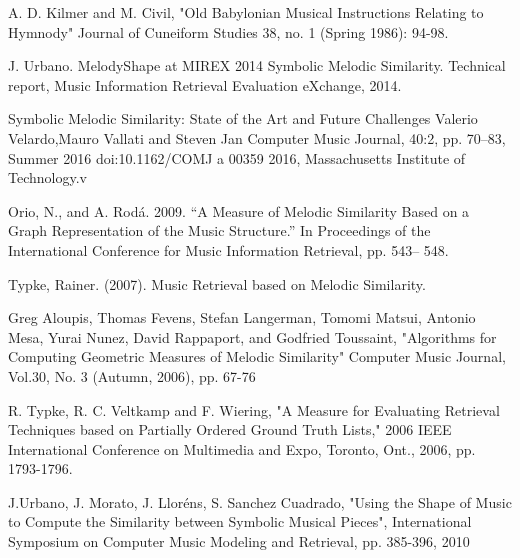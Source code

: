 \documentclass{llncs}
\begin{document}
\begin{itemize}

	\begin{thebibliography}{7}
	
	A. D. Kilmer and M. Civil, 
	"Old Babylonian Musical Instructions Relating to Hymnody" 
	Journal of Cuneiform Studies 38, 
	no. 1 (Spring 1986): 94-98.

	J. Urbano. MelodyShape at 
	MIREX 2014 Symbolic Melodic Similarity. 
	Technical report, Music Information Retrieval Evaluation eXchange, 2014.

	Symbolic Melodic Similarity: State of the Art and Future Challenges
	Valerio Velardo,Mauro Vallati and Steven Jan
	Computer Music Journal, 40:2, pp. 70–83, Summer 2016 doi:10.1162/COMJ a 00359
	2016, Massachusetts Institute of Technology.v

	 Orio, N., and A. Rodá. 2009. “A Measure of Melodic Similarity Based on a Graph Representation of the Music Structure.” In Proceedings of the International Conference for Music Information Retrieval, pp. 543– 548.

	 Typke, Rainer. (2007). Music Retrieval based on Melodic Similarity.

	 Greg Aloupis, Thomas Fevens, Stefan Langerman, Tomomi Matsui, Antonio Mesa, Yurai Nunez, David Rappaport, and Godfried Toussaint, "Algorithms for Computing Geometric Measures of Melodic Similarity" Computer Music Journal, Vol.30, No. 3 (Autumn, 2006), pp. 67-76

	 R. Typke, R. C. Veltkamp and F. Wiering, "A Measure for Evaluating Retrieval Techniques based on Partially Ordered Ground Truth Lists," 2006 IEEE International Conference on Multimedia and Expo, Toronto, Ont., 2006, pp. 1793-1796.
	
	 J.Urbano, J. Morato, J. Lloréns, S. Sanchez Cuadrado, "Using the Shape of Music to Compute the Similarity between Symbolic Musical Pieces", International Symposium on Computer Music Modeling and Retrieval, pp. 385-396, 2010
	

\end{thebibliography}
\end{itemize}
\end{document}
